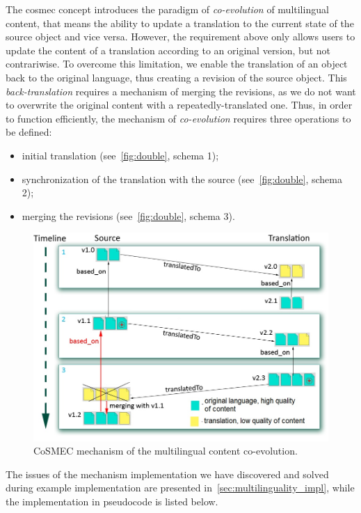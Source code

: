 \documentclass[PhD, Submit, ngerman,UKenglish,table]{scrbook}
\begin{document}
The \gls{cosmec} concept introduces the paradigm of \emph{co-evolution} of multilingual content, that means the ability to update a translation to the current state of the source object and vice versa.
However, the requirement above only allows users to update the content of a translation according to an original version, but not contrariwise.
To overcome this limitation, we enable the translation of an object back to the original language, thus creating a revision of the source object.
This \emph{back-translation} requires a mechanism of merging the revisions, as we do not want to overwrite the original content with a repeatedly-translated one.
Thus, in order to function efficiently, the mechanism of \emph{co-evolution} requires three operations to be defined:
\begin{itemize}
\item initial translation (see~\autoref{fig:double}, schema 1);
\item synchronization of the translation with the source (see~\autoref{fig:double}, schema 2);
\item merging the revisions (see~\autoref{fig:double}, schema 3).
\end{itemize}

\begin{figure}[!ht]
	\centering
		\includegraphics[width=.8\textwidth]{images/double-translation.jpg}
	\caption{CoSMEC mechanism of the multilingual content co-evolution.}
	\label{fig:double}
\end{figure}

The issues of the mechanism implementation we have discovered and solved during example implementation are presented in~\autoref{sec:multilinguality_impl}, while the implementation in pseudocode is listed below.
\end{document}

